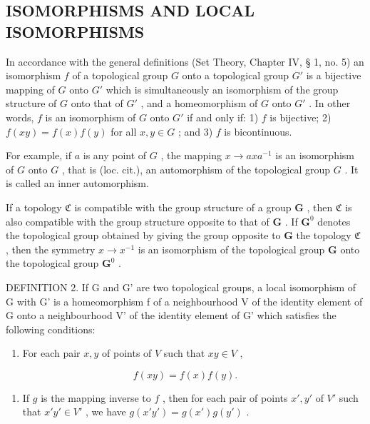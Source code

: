 \subsection{ISOMORPHISMS AND LOCAL ISOMORPHISMS}

In accordance with the general definitions (Set Theory, Chapter IV, § 1, no. 5) an isomorphism \(f\) of a topological group \(G\) onto a topological group \(G'\) is a bijective mapping of \(G\) onto \(G'\) which is simultaneously an isomorphism of the group structure of \(G\) onto that of \(G'\) , and a homeomorphism of \(G\) onto \(G'\) . In other words, \(f\) is an isomorphism of \(G\) onto \(G'\) if and only if: 1) \(f\) is bijective; 2) \(f(xy) = f(x)f(y)\) for all \(x, y \in G\) ; and 3) \(f\) is bicontinuous.

For example, if \(a\) is any point of \(G\) , the mapping \(x \to axa^{-1}\) is an isomorphism of \(G\) onto \(G\) , that is (loc. cit.), an automorphism of the topological group \(G\) . It is called an inner automorphism.

If a topology \(\mathfrak{C}\) is compatible with the group structure of a group \(\mathbf{G}\) , then \(\mathfrak{C}\) is also compatible with the group structure opposite to that of \(\mathbf{G}\) . If \(\mathbf{G}^0\) denotes the topological group obtained by giving the group opposite to \(\mathbf{G}\) the topology \(\mathfrak{C}\) , then the symmetry \(x \to x^{-1}\) is an isomorphism of the topological group \(\mathbf{G}\) onto the topological group \(\mathbf{G}^0\) .

DEFINITION 2. If G and G' are two topological groups, a local isomorphism of G with G' is a homeomorphism f of a neighbourhood V of the identity element of G onto a neighbourhood V' of the identity element of G' which satisfies the following conditions:

\begin{enumerate}
\def\labelenumi{\arabic{enumi})}
\tightlist
\item
  For each pair \(x, y\) of points of \(V\) such that \(xy \in V\) ,
\end{enumerate}

\[
f (x y) = f (x) f (y).
\]

\begin{enumerate}
\def\labelenumi{\arabic{enumi})}
\setcounter{enumi}{1}
\tightlist
\item
  If \(g\) is the mapping inverse to \(f\) , then for each pair of points \(x', y'\) of \(V'\) such that \(x'y' \in V'\) , we have \(g(x'y') = g(x')g(y')\) .
\end{enumerate}

